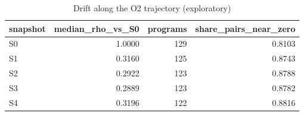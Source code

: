 \begin{table}[t]
\centering
\caption{Drift along the O2 trajectory (exploratory)}
\label{tab:v3-1-drift-decay}
\begin{tabular}{lrrr}
\toprule
snapshot & median\_rho\_vs\_S0 & programs & share\_pairs\_near\_zero \\
\midrule
S0 & 1.0000 & 129 & 0.8103 \\
S1 & 0.3160 & 125 & 0.8743 \\
S2 & 0.2922 & 123 & 0.8788 \\
S3 & 0.2889 & 123 & 0.8782 \\
S4 & 0.3196 & 122 & 0.8816 \\
\bottomrule
\end{tabular}
\end{table}
